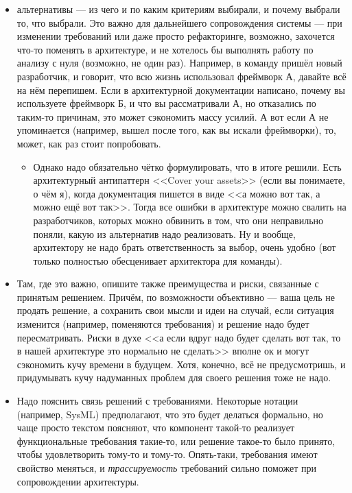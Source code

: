 \documentclass{../mcstext}
\begin{document}
\begin{itemize}
    \item альтернативы --- из чего и по каким критериям выбирали, и почему выбрали то, что выбрали. Это важно для дальнейшего сопровождения системы --- при изменении требований или даже просто рефакторинге, возможно, захочется что-то поменять в архитектуре, и не хотелось бы выполнять работу по анализу с нуля (возможно, не один раз). Например, в команду пришёл новый разработчик, и говорит, что всю жизнь использовал фреймворк А, давайте всё на нём перепишем. Если в архитектурной документации написано, почему вы используете фреймворк Б, и что вы рассматривали А, но отказались по таким-то причинам, это может сэкономить массу усилий. А вот если А не упоминается (например, вышел после того, как вы искали фреймворки), то, может, как раз стоит попробовать.
    \begin{itemize}
        \item Однако надо обязательно чётко формулировать, что в итоге решили. Есть архитектурный антипаттерн <<Cover your assets>> (если вы понимаете, о чём я), когда документация пишется в виде <<а можно вот так, а можно ещё вот так>>. Тогда все ошибки в архитектуре можно свалить на разработчиков, которых можно обвинить в том, что они неправильно поняли, какую из альтернатив надо реализовать. Ну и вообще, архитектору не надо брать ответственность за выбор, очень удобно (вот только полностью обесценивает архитектора для команды).
    \end{itemize}
    \item Там, где это важно, опишите также преимущества и риски, связанные с принятым решением. Причём, по возможности объективно --- ваша цель не продать решение, а сохранить свои мысли и идеи на случай, если ситуация изменится (например, поменяются требования) и решение надо будет пересматривать. Риски в духе <<а если вдруг надо будет сделать вот так, то в нашей архитектуре это нормально не сделать>> вполне ок и могут сэкономить кучу времени в будущем. Хотя, конечно, всё не предусмотришь, и придумывать кучу надуманных проблем для своего решения тоже не надо.
    \item Надо пояснить связь решений с требованиями. Некоторые нотации (например, SysML) предполагают, что это будет делаться формально, но чаще просто текстом поясняют, что компонент такой-то реализует функциональные требования такие-то, или решение такое-то было принято, чтобы удовлетворить тому-то и тому-то. Опять-таки, требования имеют свойство меняться, и \emph{трассируемость} требований сильно поможет при сопровождении архитектуры.
\end{itemize}
\end{document}
